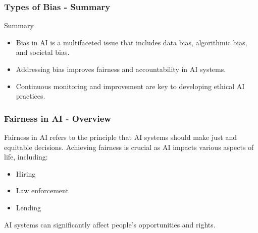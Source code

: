 \documentclass{beamer}
\begin{document}
\begin{frame}[fragile]
    \frametitle{Types of Bias - Summary}
    \begin{block}{Summary}
        \begin{itemize}
            \item Bias in AI is a multifaceted issue that includes data bias, algorithmic bias, and societal bias.
            \item Addressing bias improves fairness and accountability in AI systems.
            \item Continuous monitoring and improvement are key to developing ethical AI practices.
        \end{itemize}
    \end{block}
\end{frame}

\begin{frame}[fragile]
    \frametitle{Fairness in AI - Overview}
    Fairness in AI refers to the principle that AI systems should make just and equitable decisions. Achieving fairness is crucial as AI impacts various aspects of life, including:
    \begin{itemize}
        \item Hiring
        \item Law enforcement
        \item Lending
    \end{itemize}
    AI systems can significantly affect people's opportunities and rights.
\end{frame}
\end{document}
